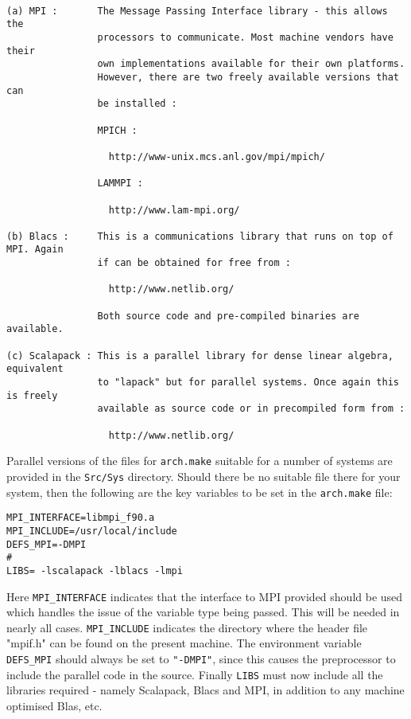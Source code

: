 \documentclass[11pt]{article}
\begin{document}
\begin{verbatim}

(a) MPI :       The Message Passing Interface library - this allows the 
                processors to communicate. Most machine vendors have their 
                own implementations available for their own platforms. 
                However, there are two freely available versions that can 
                be installed :

                MPICH :

                  http://www-unix.mcs.anl.gov/mpi/mpich/

                LAMMPI :

                  http://www.lam-mpi.org/

(b) Blacs :     This is a communications library that runs on top of MPI. Again
                if can be obtained for free from :

                  http://www.netlib.org/

                Both source code and pre-compiled binaries are available.

(c) Scalapack : This is a parallel library for dense linear algebra, equivalent
                to "lapack" but for parallel systems. Once again this is freely
                available as source code or in precompiled form from :

                  http://www.netlib.org/

\end{verbatim}

\noindent
Parallel versions of the files for {\tt arch.make} suitable for a
number of systems are provided in the {\tt Src/Sys} directory. Should
there be no suitable file there for your system, then the following
are the key variables to be set in the {\tt arch.make} file:

\begin{verbatim}
MPI_INTERFACE=libmpi_f90.a
MPI_INCLUDE=/usr/local/include
DEFS_MPI=-DMPI
#
LIBS= -lscalapack -lblacs -lmpi
\end{verbatim}

Here {\tt MPI\_INTERFACE} indicates that the interface to MPI provided
should be used which handles the issue of the variable type being
passed. This will be needed in nearly all cases. {\tt MPI\_INCLUDE}
indicates the directory where the header file "mpif.h" can be found on
the present machine. The environment variable {\tt DEFS\_MPI} should always
be set to {\tt "-DMPI"}, since this causes the preprocessor to include the
parallel code in the source. Finally {\tt LIBS} must now include all the
libraries required - namely Scalapack, Blacs and MPI, in addition to
any machine optimised Blas, etc.
\end{document}
